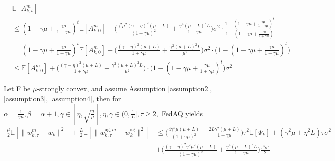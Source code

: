 \begin{align*}
    &\mathbb{E}[A_{k, t}^m] \\
    &\leq (1-\gamma\mu+\frac{\gamma\mu}{1+\gamma\mu})^t\mathbb{E}[A_{k, 0}^m] + \Big(\frac{\gamma^2\mu^2(\gamma-\eta)^2(\mu+L)}{(1+\gamma\mu)^2} + \frac{\gamma^4(\mu+L)^2 L}{1+\gamma\mu}\Big)\sigma^2 \cdot \frac{1-(1-\gamma\mu+\frac{\gamma\mu}{1+\gamma\mu})^t}{1-(1-\gamma\mu+\frac{\gamma\mu}{1+\gamma\mu})} \\
    &= (1-\gamma\mu+\frac{\gamma\mu}{1+\gamma\mu})^t\mathbb{E}[A_{k, 0}^m] + \Big( \frac{(\gamma-\eta)^2(\mu+L)}{1+\gamma\mu}+\frac{\gamma^2(\mu+L)^2 L}{\mu^2}\Big)\sigma^2 \cdot \Big(1-(1-\gamma\mu+\frac{\gamma\mu}{1+\gamma\mu})^t\Big) \\
    &\leq \mathbb{E}[A_{k, 0}^m] + \Big( \frac{(\gamma-\eta)^2(\mu+L)}{1+\gamma\mu}+\frac{\gamma^2(\mu+L)^2 L}{\mu^2}\Big)\cdot \Big( 1-(1-\gamma\mu+\frac{\gamma\mu}{1+\gamma\mu})^t\Big)\sigma^2
\end{align*}

\begin{proposition} \label{proposition3.6}
Let F be $\mu$-strongly convex, and assume Assumption \ref{assumption2}, \ref{assumption3}, \ref{assumption4}, then for $\alpha=\frac{1}{\gamma\mu}, \beta=\alpha+1, \gamma \in [\eta, \sqrt{\frac{\eta}{\mu}}], \eta, \gamma \in (0, \frac{1}{L}], \tau \geq 2,$ FedAQ yields
\begin{align*}
    \frac{\mu}{2}\mathbb{E}[\|w_{k, \tau}^m - w_k\|^2] + \frac{L}{2} \mathbb{E}[\|w_{k, \tau}^{\textrm{ag}, m} - w_k^{\textrm{ag}}\|^2] &\leq \Big( \frac{4\gamma^2\mu(\mu+L)}{(1+\gamma\mu)^2} + \frac{2L\gamma^2(\mu+L)}{1+\gamma\mu}\Big)\tau^2 \mathbb{E}[\Psi_k] + (\gamma^2\mu+\eta^2 L)\tau\sigma^2 \\
    &+ \Big( \frac{(\gamma-\eta)^2\gamma^2\mu^2(\mu+L)}{(1+\gamma\mu)^2} + \frac{\gamma^4(\mu+L)^2 L}{1+\gamma\mu} \Big) \frac{\tau^3\sigma^2}{2}
\end{align*}
\end{proposition}

